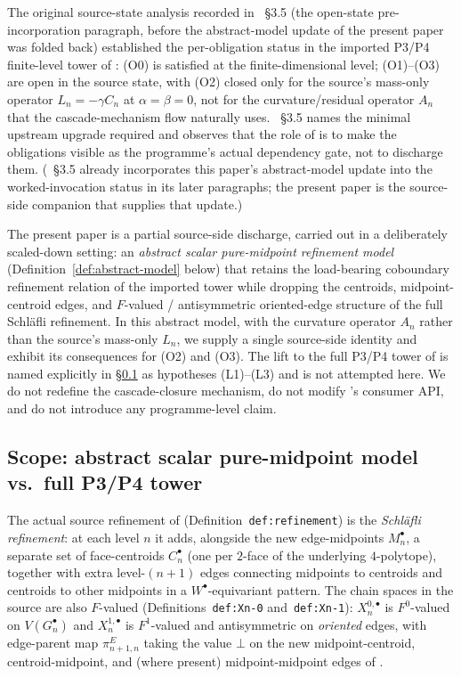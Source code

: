 \documentclass[11pt]{article}
\theoremstyle{plain}
\theoremstyle{definition}
\theoremstyle{remark}
\begin{document}
The original source-state analysis recorded in
\cite{CascadeMechanism}~\S3.5 (the open-state pre-incorporation
paragraph, before the abstract-model update of the present paper
was folded back) established the per-obligation status in the
imported P3/P4 finite-level tower of
\cite{CascadeRefinementSpaces, CascadeClosureDynamics}: (O0) is
satisfied at the finite-dimensional level; (O1)--(O3) are open in
the source state, with (O2) closed only for the source's mass-only
operator $L_n = -\gamma C_n$ at $\alpha = \beta = 0$, not for the
curvature/residual operator $A_n$ that the cascade-mechanism flow
naturally uses. \cite{CascadeMechanism}~\S3.5 names the minimal
upstream upgrade required and observes that the role of
\cite{CascadeMechanism} is to make the obligations visible as the
programme's actual dependency gate, not to discharge them.
(\cite{CascadeMechanism}~\S3.5 already incorporates this paper's
abstract-model update into the worked-invocation status in its
later paragraphs; the present paper is the source-side companion
that supplies that update.)

The present paper is a partial source-side discharge, carried out
in a deliberately scaled-down setting: an \emph{abstract scalar
pure-midpoint refinement model} (Definition~\ref{def:abstract-model}
below) that retains the load-bearing coboundary refinement relation
of the imported tower while dropping the centroids,
midpoint-centroid edges, and $F$-valued / antisymmetric oriented-edge
structure of the full Schl\"{a}fli refinement. In this abstract
model, with the curvature operator $A_n$ rather than the source's
mass-only $L_n$, we supply a single source-side identity and
exhibit its consequences for (O2) and (O3). The lift to the full
P3/P4 tower of \cite{CascadeRefinementSpaces, CascadeClosureDynamics}
is named explicitly in \S\ref{sec:scope-and-gap} as hypotheses
\textup{(L1)}--\textup{(L3)} and is not attempted here. We do not
redefine the cascade-closure mechanism, do not modify
\cite{CascadeMechanism}'s consumer API, and do not introduce any
programme-level claim.

\subsection{Scope: abstract scalar pure-midpoint model vs.\ full P3/P4 tower}\label{sec:scope-and-gap}

The actual source refinement of \cite{CascadeRefinementSpaces}
(Definition~\texttt{def:refinement}) is the
\emph{Schl\"{a}fli refinement}: at each level $n$ it adds, alongside
the new edge-midpoints $M_n^{\bullet}$, a separate set of
face-centroids $C_n^{\bullet}$ (one per $2$-face of the underlying
$4$-polytope), together with extra level-$(n+1)$ edges connecting
midpoints to centroids and centroids to other midpoints in a
$W^{\bullet}$-equivariant pattern. The chain spaces in the source
are also $F$-valued (Definitions~\texttt{def:Xn-0}
and~\texttt{def:Xn-1}): $X_n^{0, \bullet}$ is $F^{0}$-valued on
$V(G_n^{\bullet})$ and $X_n^{1, \bullet}$ is $F^{1}$-valued and
antisymmetric on \emph{oriented} edges, with edge-parent map
$\pi_{n+1, n}^{E}$ taking the value $\bot$ on the new
midpoint-centroid, centroid-midpoint, and (where present)
midpoint-midpoint edges of \cite{CascadeRefinementSpaces}.
\end{document}
